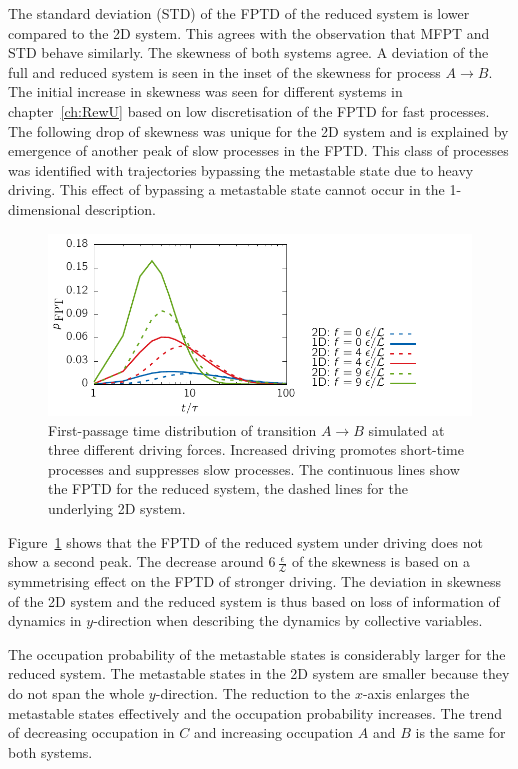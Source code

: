 The standard deviation (STD) of the FPTD of the reduced system is lower compared to the 2D system. This agrees with the observation that MFPT and STD behave similarly. The skewness of both systems agree. A deviation of the full and reduced system is seen in the inset of the skewness for  process $A \rightarrow B$. The initial increase in skewness was seen for different systems in chapter~\ref{ch:RewU} based on low discretisation of the FPTD for fast processes. The following drop of skewness was unique for the 2D system and is explained by emergence of another peak of slow processes in the FPTD. This class of processes was identified with trajectories bypassing the metastable state due to heavy driving. This effect of bypassing a metastable state cannot occur in the 1-dimensional description.
\begin{figure}[t]
\centering
 \includegraphics{../plots/Frew/fpt_1030.pdf}
  \caption[First-passage time distribution of transition $A \rightarrow B$ simulated at three different driving forces for the 2D and the reduced model. ]{First-passage time distribution of transition $A \rightarrow B$ simulated at three different driving forces. Increased driving promotes short-time processes and suppresses slow processes. The continuous lines show the FPTD for the reduced system, the dashed lines for the underlying 2D system.   }
 \label{fig:fpt1Dred}
\end{figure}
Figure~\ref{fig:fpt1Dred} shows that the FPTD of the reduced system under driving does not show a second peak. The decrease around $6\,\frac{\epsilon}{\mathcal{L}}$ of the skewness is based on a symmetrising effect on the FPTD of stronger driving. The deviation in skewness of the 2D system and the reduced system is thus based on loss of information of dynamics in $y$-direction  when describing the dynamics by collective variables.  

The occupation probability of the metastable states is considerably larger for the reduced system. The metastable states in the 2D system are smaller because they do not span the whole $y$-direction. The reduction to the $x$-axis enlarges the metastable states effectively and the occupation probability increases. The trend of decreasing occupation in $C$ and increasing occupation $A$ and $B$ is the same for both systems.

